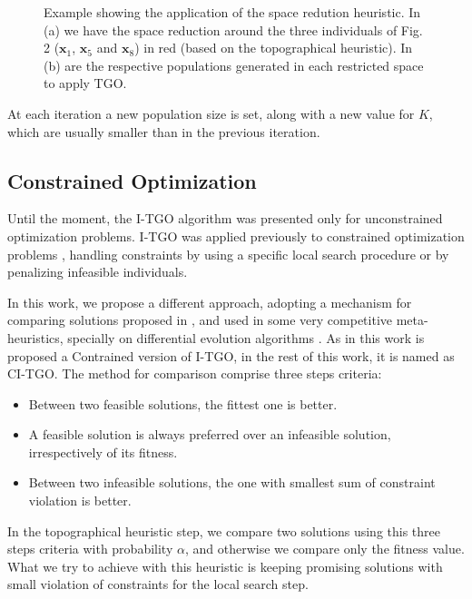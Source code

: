 \begin{figure}[tp]
\begin{subfigure}{.5\textwidth}
  \caption{}
  \label{fig:SpaceReduction-b}
\end{subfigure}
\caption{Example showing the application of the space redution heuristic. In (a) we have the space reduction around the three individuals of Fig. 2 ($\bm{x}_1$, $\bm{x}_5$ and $\bm{x}_8$) in red (based on the topographical heuristic). In (b) are the respective populations generated in each restricted space to apply TGO.}\label{fig:SpaceReduction}
\end{figure}


At each iteration a new population size is set, along with a new value for $K$, which are usually smaller than in the previous iteration.


\subsection{Constrained Optimization}

Until the moment, the I-TGO algorithm was presented only for unconstrained optimization problems. I-TGO was applied previously to constrained optimization problems \citep{ITGO2, ITGO3}, handling constraints by using a specific local search procedure or by penalizing infeasible individuals.

In this work, we propose a different approach, adopting a mechanism for comparing solutions proposed in \cite{ConHandling}, and used in some very competitive meta-heuristics, specially on differential evolution algorithms \citep{DE1, DE2, DE3}. As in this work is proposed a Contrained version of I-TGO, in the rest of this work, it is named as CI-TGO. The method for comparison comprise three steps criteria:

\begin{itemize}

\item Between two feasible solutions, the fittest one is better.

\item A feasible solution is always preferred over an infeasible solution, irrespectively of its fitness.

\item Between two infeasible solutions, the one with smallest sum of constraint violation is better.

\end{itemize}


In the topographical heuristic step, we compare two solutions using this three steps criteria with probability $\alpha$, and otherwise we compare only the fitness value. What we try to achieve with this heuristic is keeping promising solutions with small violation of constraints for the local search step.

